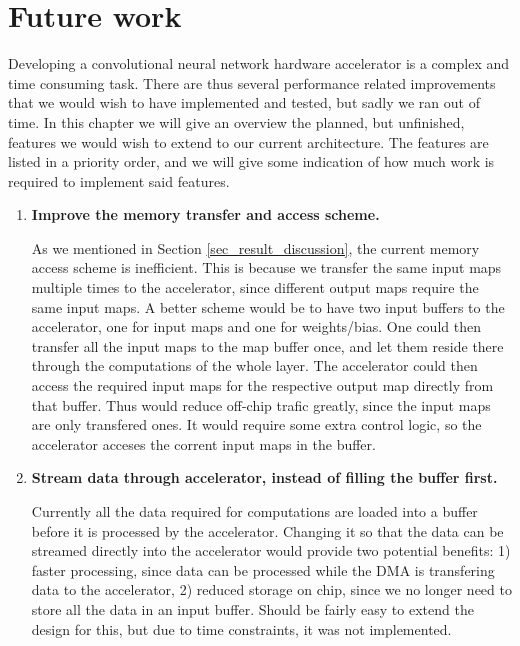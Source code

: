 \chapter{Future work} \label{chap_future_work}

Developing a convolutional neural network hardware accelerator is a complex and time consuming task. There are thus several performance related improvements that we would wish to have implemented and tested, but sadly we ran out of time. In this chapter we will give an overview the planned, but unfinished, features we would wish to extend to our current architecture. The features are listed in a priority order, and we will give some indication of how much work is required to implement said features.


\begin{enumerate}                           


  \item \textbf{Improve the memory transfer and access scheme.}
    
    As we mentioned in Section \ref{sec_result_discussion}, the current memory access scheme is inefficient. This is because we transfer the same input maps multiple times to the accelerator, since different output maps require the same input maps. A better scheme would be to have two input buffers to the accelerator, one for input maps and one for weights/bias. One could then transfer all the input maps to the map buffer once, and let them reside there through the computations of the whole layer. The accelerator could then access the required input maps for the respective output map directly from that buffer. Thus would reduce off-chip trafic greatly, since the input maps are only transfered ones. It would require some extra control logic, so the accelerator acceses the corrent input maps in the buffer. 

	\item \textbf{Stream data through accelerator, instead of filling the buffer first.}
	
	Currently all the data required for computations are loaded into a buffer before it is processed by the accelerator. Changing it so that the data can be streamed directly into the accelerator would provide two potential benefits: 1) faster processing, since data can be processed while the DMA is transfering data to the accelerator, 2) reduced storage on chip, since we no longer need to store all the data in an input buffer. Should be fairly easy to extend the design for this, but due to time constraints, it was not implemented. 


\end{enumerate}
